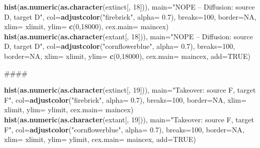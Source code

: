 \documentclass[]{book}
\newenvironment{Shaded}{\begin{snugshade}}{\end{snugshade}}
\newcommand{\KeywordTok}[1]{\textcolor[rgb]{0.13,0.29,0.53}{\textbf{{#1}}}}
\newcommand{\DataTypeTok}[1]{\textcolor[rgb]{0.13,0.29,0.53}{{#1}}}
\newcommand{\DecValTok}[1]{\textcolor[rgb]{0.00,0.00,0.81}{{#1}}}
\newcommand{\FloatTok}[1]{\textcolor[rgb]{0.00,0.00,0.81}{{#1}}}
\newcommand{\StringTok}[1]{\textcolor[rgb]{0.31,0.60,0.02}{{#1}}}
\newcommand{\OtherTok}[1]{\textcolor[rgb]{0.56,0.35,0.01}{{#1}}}
\newcommand{\NormalTok}[1]{{#1}}
\theoremstyle{definition}
\theoremstyle{definition}
\theoremstyle{definition}
\theoremstyle{remark}
\begin{document}
\begin{Shaded}
\begin{Highlighting}[]
\KeywordTok{hist}\NormalTok{(}\KeywordTok{as.numeric}\NormalTok{(}\KeywordTok{as.character}\NormalTok{(extinct[, }\DecValTok{18}\NormalTok{])), }\DataTypeTok{main=}\StringTok{"NOPE -- Diffusion: source D, target D"}\NormalTok{, }\DataTypeTok{col=}\KeywordTok{adjustcolor}\NormalTok{(}\StringTok{"firebrick"}\NormalTok{, }\DataTypeTok{alpha=} \FloatTok{0.7}\NormalTok{), }\DataTypeTok{breaks=}\DecValTok{100}\NormalTok{, }\DataTypeTok{border=}\OtherTok{NA}\NormalTok{, }\DataTypeTok{xlim=}\NormalTok{ xlimit, }\DataTypeTok{ylim=} \KeywordTok{c}\NormalTok{(}\DecValTok{0}\NormalTok{,}\DecValTok{18000}\NormalTok{), }\DataTypeTok{cex.main=}\NormalTok{ maincex)}
\KeywordTok{hist}\NormalTok{(}\KeywordTok{as.numeric}\NormalTok{(}\KeywordTok{as.character}\NormalTok{(extant[, }\DecValTok{18}\NormalTok{])), }\DataTypeTok{main=}\StringTok{"NOPE -- Diffusion: source D, target D"}\NormalTok{, }\DataTypeTok{col=}\KeywordTok{adjustcolor}\NormalTok{(}\StringTok{"cornflowerblue"}\NormalTok{, }\DataTypeTok{alpha=} \FloatTok{0.7}\NormalTok{), }\DataTypeTok{breaks=}\DecValTok{100}\NormalTok{, }\DataTypeTok{border=}\OtherTok{NA}\NormalTok{, }\DataTypeTok{xlim=}\NormalTok{ xlimit, }\DataTypeTok{ylim=} \KeywordTok{c}\NormalTok{(}\DecValTok{0}\NormalTok{,}\DecValTok{18000}\NormalTok{), }\DataTypeTok{cex.main=}\NormalTok{ maincex, }\DataTypeTok{add=}\OtherTok{TRUE}\NormalTok{)}

\NormalTok{####}

\KeywordTok{hist}\NormalTok{(}\KeywordTok{as.numeric}\NormalTok{(}\KeywordTok{as.character}\NormalTok{(extinct[, }\DecValTok{19}\NormalTok{])), }\DataTypeTok{main=}\StringTok{"Takeover: source F, target F"}\NormalTok{, }\DataTypeTok{col=}\KeywordTok{adjustcolor}\NormalTok{(}\StringTok{"firebrick"}\NormalTok{, }\DataTypeTok{alpha=} \FloatTok{0.7}\NormalTok{), }\DataTypeTok{breaks=}\DecValTok{100}\NormalTok{, }\DataTypeTok{border=}\OtherTok{NA}\NormalTok{, }\DataTypeTok{xlim=}\NormalTok{ xlimit, }\DataTypeTok{ylim=}\NormalTok{ ylimit, }\DataTypeTok{cex.main=}\NormalTok{ maincex)}
\KeywordTok{hist}\NormalTok{(}\KeywordTok{as.numeric}\NormalTok{(}\KeywordTok{as.character}\NormalTok{(extant[, }\DecValTok{19}\NormalTok{])), }\DataTypeTok{main=}\StringTok{"Takeover: source F, target F"}\NormalTok{, }\DataTypeTok{col=}\KeywordTok{adjustcolor}\NormalTok{(}\StringTok{"cornflowerblue"}\NormalTok{, }\DataTypeTok{alpha=} \FloatTok{0.7}\NormalTok{), }\DataTypeTok{breaks=}\DecValTok{100}\NormalTok{, }\DataTypeTok{border=}\OtherTok{NA}\NormalTok{, }\DataTypeTok{xlim=}\NormalTok{ xlimit, }\DataTypeTok{ylim=}\NormalTok{ ylimit, }\DataTypeTok{cex.main=}\NormalTok{ maincex, }\DataTypeTok{add=}\OtherTok{TRUE}\NormalTok{)}




\end{Highlighting}
\end{Shaded}
\end{document}
